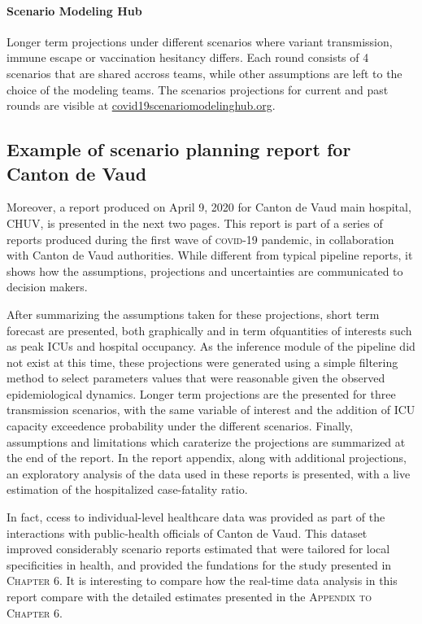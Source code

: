 {\paragraph{Scenario Modeling Hub} Longer term projections under different scenarios where \eg variant transmission, immune escape or vaccination hesitancy  differs. Each round consists of 4 scenarios that are shared accross teams, while other assumptions are left to the choice of the modeling teams. The scenarios projections for current and past rounds are visible at \url{covid19scenariomodelinghub.org}\cite[][presents round 4 results.]{Borchering:ModelingFutureCOVID19:2021}.

\subsection{Example of scenario planning report for Canton de Vaud}
Moreover, a report produced on April 9, 2020 for Canton de Vaud main hospital, CHUV, is presented in the next two pages. This report is part of a series of reports produced during the first wave of \textsc{covid}-19 pandemic, in collaboration with Canton de Vaud authorities. While different from typical pipeline reports, it shows how the assumptions, projections and uncertainties are communicated to decision makers. 

After summarizing the assumptions taken for these projections, short term forecast are presented, both graphically and in term ofquantities of interests such as peak ICUs and hospital occupancy. As the inference module of the pipeline did not exist at this time, these projections were generated using a simple filtering method to select parameters values that were reasonable given the observed epidemiological dynamics.  Longer term projections are the presented for three transmission scenarios, with the same variable of interest and the addition of ICU capacity exceedence probability under the different scenarios. Finally, assumptions and limitations which caraterize the projections are summarized at the end of the report. In the report appendix, along with additional projections, an exploratory analysis of the data used in these reports is presented, with a live estimation of the hospitalized case-fatality ratio. 

In fact, ccess to individual-level healthcare data was provided as part of the interactions with public-health officials of Canton de Vaud.  This dataset improved considerably scenario reports estimated that were tailored for local specificities in health, and provided the fundations for the study presented in \textsc{Chapter 6}. It is interesting to compare how the real-time data analysis in this report compare with the detailed estimates presented in the \textsc{Appendix to Chapter 6}.

}
